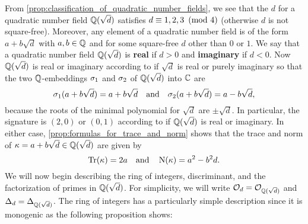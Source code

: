     From \cref{prop:classification_of_quadratic_number_fields}, we see that the $d$ for a quadratic number field $\mathbb{Q}(\sqrt{d})$ satisfies $d \equiv 1,2,3 \ \left(\text{mod }4\right)$ (otherwise $d$ is not square-free). Moreover, any element of a quadratic number field is of the form $a+b\sqrt{d}$ with $a,b \in \mathbb{Q}$ and for some square-free $d$ other than $0$ or $1$. We say that a quadratic number field $\mathbb{Q}(\sqrt{d})$ is \textbf{real} if $d > 0$ and \textbf{imaginary} if $d < 0$. Now $\mathbb{Q}(\sqrt{d})$ is real or imaginary according to if $\sqrt{d}$ is real or purely imaginary so that the two $\mathbb{Q}$-embeddings $\sigma_{1}$ and $\sigma_{2}$ of $\mathbb{Q}(\sqrt{d})$ into $\mathbb{C}$ are
    \[
      \sigma_{1}(a+b\sqrt{d}) = a+b\sqrt{d} \quad \text{and} \quad \sigma_{2}(a+b\sqrt{d}) = a-b\sqrt{d},
    \]
    because the roots of the minimal polynomial for $\sqrt{d}$ are $\pm\sqrt{d}$. In particular, the signature is $(2,0)$ or $(0,1)$ according to if $\mathbb{Q}(\sqrt{d})$ is real or imaginary. In either case, \cref{prop:formulas_for_trace_and_norm} shows that the trace and norm of $\kappa = a+b\sqrt{d} \in \mathbb{Q}(\sqrt{d})$ are given by
    \[
      \operatorname{\mathrm{Tr}}(\kappa) = 2a \quad \text{and} \quad \operatorname{\mathrm{N}}(\kappa) = a^{2}-b^{2}d.
    \]
    We will now begin describing the ring of integers, discriminant, and the factorization of primes in $\mathbb{Q}(\sqrt{d})$. For simplicity, we will write $\mathcal{O}_{d} = \mathcal{O}_{\mathbb{Q}(\sqrt{d})}$ and $\Delta_{d} = \Delta_{\mathbb{Q}(\sqrt{d})}$. The ring of integers has a particularly simple description since it is monogenic as the following proposition shows:
    
